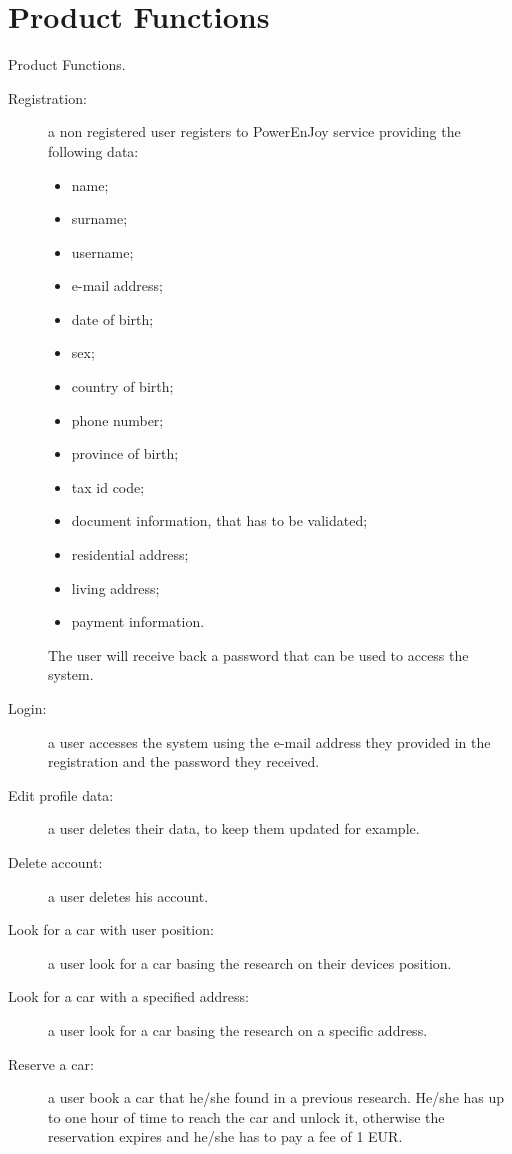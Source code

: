 \section{Product Functions}
Product Functions.
\begin{description}
\item[Registration:] a non registered user registers to PowerEnJoy service providing the following data:
	\begin{itemize}
	\item name;
	\item surname;
	\item username;
	\item e-mail address;
	\item date of birth;
	\item sex;
	\item country of birth;
	\item phone number;
	\item province of birth;
	\item tax id code; %
	\item document information, that has to be validated;
	\item residential address;
	\item living address;
	\item payment information.
	\end{itemize}
	The user will receive back a password that can be used to access the system.
\item[Login:] a user accesses the system using the e-mail address they provided in the registration and the password they received.
\item[Edit profile data:] a user deletes their data, to keep them updated for example.
\item[Delete account:] a user deletes his account.
\item[Look for a car with user position:] a user look for a car basing the research on their devices position.
\item[Look for a car with a specified address:] a user look for a car basing the research on a specific address.
\item[Reserve a car:] a user book a car that he/she found in a previous research. He/she has up to one hour of time to reach the car and unlock it, otherwise the reservation expires and he/she has to pay a fee of 1 EUR.

\end{description}
